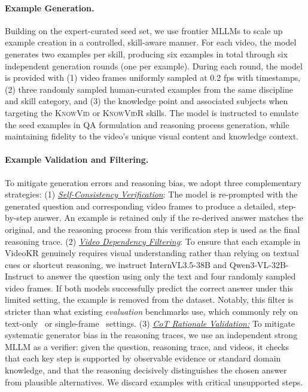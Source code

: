 \documentclass{llmxive}
\providecommand{\data}{VideoKR\xspace}
\providecommand{\kv}{\textsc{KnowVid}\xspace}
\providecommand{\kvr}{\textsc{KnowVidR}\xspace}
\begin{document}
\vspace{-8pt}
\paragraph{Example Generation.}
Building on the expert-curated seed set, we use frontier MLLMs to scale up example creation in a controlled, skill-aware manner.
For each video, the model generates two examples per skill, producing six examples in total through six independent generation rounds (one per example).
During each round, the model is provided with (1) video frames uniformly sampled at 0.2 fps with timestamps, (2) three randomly sampled human-curated examples from the same discipline and skill category, and (3) the knowledge point and associated subjects when targeting the \kv or \kvr skills. 
The model is instructed to emulate the seed examples in QA formulation and reasoning process generation, while maintaining fidelity to the video’s unique visual content and knowledge context.





\vspace{-8pt}
\paragraph{Example Validation and Filtering.}
To mitigate generation errors and reasoning bias, we adopt three complementary strategies:
(1) \underline{\emph{Self-Consistency Verification}}: The model is re-prompted with the generated question and corresponding video frames to produce a detailed, step-by-step answer. An example is retained only if the re-derived answer matches the original, and the reasoning process from this verification step is used as the final reasoning trace.
(2) \underline{\emph{Video Dependency Filtering}}: To ensure that each example in \data genuinely requires visual understanding rather than relying on textual cues or shortcut reasoning, we instruct InternVL3.5-38B and Qwen3-VL-32B-Instruct to answer the question using only the text and four randomly sampled video frames. If both models successfully predict the correct answer under this limited setting, the example is removed from the dataset. Notably, this filter is stricter than what existing \emph{evaluation} benchmarks use, which commonly rely on text-only~\cite{videmme, di2024grounded} or single-frame~\cite{saravanan2025velociti, Plizzari2025OmniaDE} settings.
(3) \underline{\emph{CoT Rationale Validation:}} To mitigate systematic generator bias in the reasoning traces, we use an independent strong MLLM as a verifier: given the question, reasoning trace, and videos, it checks that each key step is supported by observable evidence or standard domain knowledge, and that the reasoning decisively distinguishes the chosen answer from plausible alternatives. We discard examples with critical unsupported steps.
\end{document}
